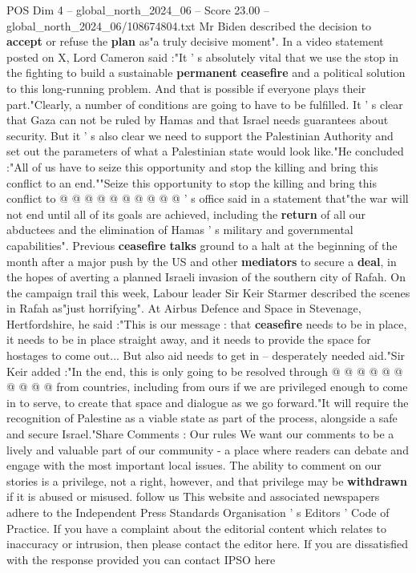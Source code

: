 \begin{textsample}{POS Dim 4 – global\_north\_2024\_06 – Score 23.00 – global\_north\_2024\_06/108674804.txt}
Mr Biden described the decision to \textbf{accept} or refuse the \textbf{plan} as"a truly decisive moment".
In a video statement posted on X, Lord Cameron said :"It ' s absolutely vital that we use the stop in the fighting to build a sustainable \textbf{permanent} \textbf{ceasefire} and a political solution to this long-running problem.
And that is possible if everyone plays their part."Clearly, a number of conditions are going to have to be fulfilled.
It ' s clear that Gaza can not be ruled by Hamas and that Israel needs guarantees about security.
But it ' s also clear we need to support the Palestinian Authority and set out the parameters of what a Palestinian state would look like."He concluded :"All of us have to seize this opportunity and stop the killing and bring this conflict to an end.""Seize this opportunity to stop the killing and bring this conflict to @ @ @ @ @ @ @ @ @ @ ' s office said in a statement that"the war will not end until all of its goals are achieved, including the \textbf{return} of all our abductees and the elimination of Hamas ' s military and governmental capabilities".
Previous \textbf{ceasefire} \textbf{talks} ground to a halt at the beginning of the month after a major push by the US and other \textbf{mediators} to secure a \textbf{deal}, in the hopes of averting a planned Israeli invasion of the southern city of Rafah.
On the campaign trail this week, Labour leader Sir Keir Starmer described the scenes in Rafah as"just horrifying".
At Airbus Defence and Space in Stevenage, Hertfordshire, he said :"This is our message : that \textbf{ceasefire} needs to be in place, it needs to be in place straight away, and it needs to provide the space for hostages to come out...
But also aid needs to get in -- desperately needed aid."Sir Keir added :"In the end, this is only going to be resolved through @ @ @ @ @ @ @ @ @ @ from countries, including from ours if we are privileged enough to come in to serve, to create that space and dialogue as we go forward."It will require the recognition of Palestine as a viable state as part of the process, alongside a safe and secure Israel."Share Comments : Our rules We want our comments to be a lively and valuable part of our community - a place where readers can debate and engage with the most important local issues.
The ability to comment on our stories is a privilege, not a right, however, and that privilege may be \textbf{withdrawn} if it is abused or misused. follow us This website and associated newspapers adhere to the Independent Press Standards Organisation ' s Editors ' Code of Practice.
If you have a complaint about the editorial content which relates to inaccuracy or intrusion, then please contact the editor here.
If you are dissatisfied with the response provided you can contact IPSO here

\end{textsample}
